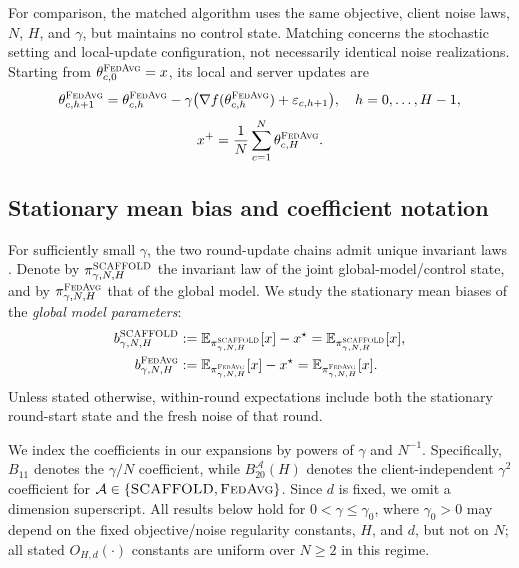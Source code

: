 For comparison, the matched \FedAvg{} algorithm uses the same objective, client noise laws, $N$, $H$, and $\gamma$, but maintains no control state. Matching concerns the stochastic setting and local-update configuration, not necessarily identical noise realizations. Starting from $\theta^{\textnormal{\textsc{FedAvg}}}_{c,0}=x$, its local and server updates are
\begin{equation}
\label{eq:fa-local}
\theta^{\textnormal{\textsc{FedAvg}}}_{c,h+1}
=\theta^{\textnormal{\textsc{FedAvg}}}_{c,h}-\gamma\bigl(
\nabla f(\theta^{\textnormal{\textsc{FedAvg}}}_{c,h})+\varepsilon_{c,h+1}\bigr),
\quad h=0,\ldots,H-1,
\end{equation}
\begin{equation}
\label{eq:fa-server}
x^+=\frac1N\sum_{c=1}^{N}\theta^{\textnormal{\textsc{FedAvg}}}_{c,H}.
\end{equation}

\subsection{Stationary mean bias and coefficient notation}

For sufficiently small $\gamma$, the two round-update chains admit unique invariant laws \citep{mangold2025scaffold,mangold2025fedavg}. Denote by $\pi^{\textnormal{\textsc{SCAFFOLD}}}_{\gamma,N,H}$ the invariant law of the joint global-model/control state, and by $\pi^{\textnormal{\textsc{FedAvg}}}_{\gamma,N,H}$ that of the \FedAvg{} global model. We study the stationary mean biases of the \emph{global model parameters}:
\begin{align}
\label{eq:scaf-bias-def}
b^{\textnormal{\textsc{SCAFFOLD}}}_{\gamma,N,H}
&:=\mathbb{E}_{\pi^{\textnormal{\textsc{SCAFFOLD}}}_{\gamma,N,H}}[x]-x^\star
=\mathbb{E}_{\pi^{\textnormal{\textsc{SCAFFOLD}}}_{\gamma,N,H}}[x],\\
\label{eq:fa-bias-def}
b^{\textnormal{\textsc{FedAvg}}}_{\gamma,N,H}
&:=\mathbb{E}_{\pi^{\textnormal{\textsc{FedAvg}}}_{\gamma,N,H}}[x]-x^\star
=\mathbb{E}_{\pi^{\textnormal{\textsc{FedAvg}}}_{\gamma,N,H}}[x].
\end{align}
Unless stated otherwise, within-round expectations include both the stationary round-start state and the fresh noise of that round.

We index the coefficients in our expansions by powers of $\gamma$ and $N^{-1}$. Specifically, $B_{11}$ denotes the $\gamma/N$ coefficient, while $B_{20}^{\mathcal A}(H)$ denotes the client-independent $\gamma^2$ coefficient for $\mathcal A\in\{\textnormal{\textsc{SCAFFOLD}},\textnormal{\textsc{FedAvg}}\}$. Since $d$ is fixed, we omit a dimension superscript. All results below hold for $0<\gamma\leq\gamma_0$, where $\gamma_0>0$ may depend on the fixed objective/noise regularity constants, $H$, and $d$, but not on $N$; all stated $O_{H,d}(\cdot)$ constants are uniform over $N\geq2$ in this regime.
